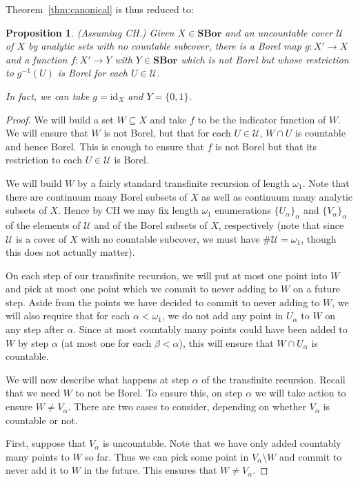 \documentclass[11pt]{amsart}
\newcommand\cU{\mathcal{U}}
\newcommand\I{^{-1}}
\newcommand\id{\mathrm{id}}
\newcommand\SBor{\mathbf{SBor}}
\newcommand\set[2][]{#1\{{#2}#1\}}
\theoremstyle{definition}
\theoremstyle{remark}
\theoremstyle{plain}
\newtheorem{propn}[defn]{Proposition}
\begin{document}
Theorem~\ref{thm:canonical} is thus reduced to:
\begin{propn}
  (Assuming \textup{CH}.)
  Given \( X \in \SBor \) and an uncountable cover \( \cU \) of \( X \) by analytic sets with no countable subcover, there is a Borel map \( g \colon X' \to X \) and a function \( f \colon X' \to Y \) with \( Y \in \SBor \) which is not Borel but whose restriction to \( g\I(U) \) is Borel for each \( U \in \cU \).

  In fact, we can take \( g = \id_X \) and $Y = \set{0, 1}$.
\end{propn}
\begin{proof}
  We will build a set $W \subseteq X$ and take $f$ to be the indicator function of $W$.
  We will ensure that $W$ is not Borel, but that for each $U \in \cU$, $W\cap U$ is countable and hence Borel.
  This is enough to ensure that $f$ is not Borel but that its restriction to each $U \in \cU$ is Borel.

  We will build $W$ by a fairly standard transfinite recursion of length $\omega_1$.
  Note that there are continuum many Borel subsets of $X$ as well as continuum many analytic subsets of $X$.
  Hence by CH we may fix length $\omega_1$ enumerations $\set{U_\alpha}_\alpha$ and $\set{V_\alpha}_\alpha$ of the elements of $\cU$ and of the Borel subsets of $X$, respectively (note that since $\cU$ is a cover of $X$ with no countable subcover, we must have $\# \cU = \omega_1$, though this does not actually matter).

  On each step of our transfinite recursion, we will put at most one point into $W$ and pick at most one point which we commit to never adding to $W$ on a future step.
  Aside from the points we have decided to commit to never adding to $W$, we will also require that for each $\alpha < \omega_1$, we do not add any point in $U_\alpha$ to $W$ on any step after $\alpha$.
  Since at most countably many points could have been added to $W$ by step $\alpha$ (at most one for each $\beta < \alpha$), this will ensure that $W \cap U_\alpha$ is countable.

  We will now describe what happens at step $\alpha$ of the transfinite recursion.
  Recall that we need $W$ to not be Borel.
  To ensure this, on step $\alpha$ we will take action to ensure $W \neq V_\alpha$.
  There are two cases to consider, depending on whether $V_\alpha$ is countable or not.

  First, suppose that $V_\alpha$ is uncountable.
  Note that we have only added countably many points to $W$ so far.
  Thus we can pick some point in $V_\alpha \setminus W$ and commit to never add it to $W$ in the future.
  This ensures that $W \neq V_\alpha$.


\end{proof}
\end{document}
